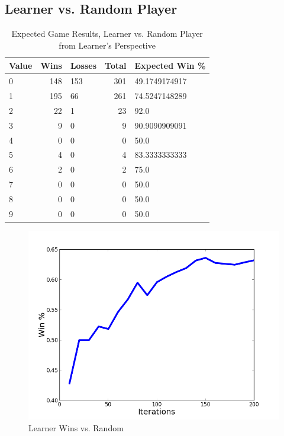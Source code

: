 \documentclass[12pt,pdftex]{article}
\begin{document}
\subsection{Learner vs. Random Player}
\begin{table}[h]
\centering
\begin{tabular}{| l | r | l | r | l |}
	\hline
 \textbf{Value} & \textbf{Wins}& \textbf{Losses}& \textbf{Total}& \textbf{Expected Win \%}\\
\hline
0& 148& 153& 301& 49.1749174917\\
1& 195& 66& 261& 74.5247148289\\
2& 22& 1& 23& 92.0\\
3& 9& 0& 9& 90.9090909091\\
4& 0& 0& 0& 50.0\\
5& 4& 0& 4& 83.3333333333\\
6& 2& 0& 2& 75.0\\
7& 0& 0& 0& 50.0\\
8& 0& 0& 0& 50.0\\
9& 0& 0& 0& 50.0\\
\hline
\end{tabular}
\caption{Expected Game Results, Learner vs. Random Player from Learner's Perspective}
\label{tab:learner_v_rand}
\end{table}
\begin{figure}[h]
	\begin{center}
		\includegraphics[scale=0.5]{figs/learnervrand.png}
		\caption{Learner Wins vs. Random}
		\label{fig:learner_v_rand}
\end{center}
\end{figure}
\end{document}
